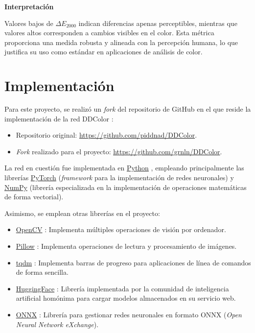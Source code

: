 \documentclass[a4paper]{article}
\begin{document}
\medskip
\textbf{Interpretación}

Valores bajos de $\Delta E_{2000}$ indican diferencias apenas perceptibles, mientras que valores altos corresponden a cambios visibles en el color. Esta métrica proporciona una medida robusta y alineada con la percepción humana, lo que justifica su uso como estándar en aplicaciones de análisis de color.

\section{Implementación}

Para este proyecto, se realizó un \textit{fork} del repositorio de GitHub en el que reside la implementación de la red DDColor \cite{DDColorRepo}:

\begin{itemize}
  \item{Repositorio original: \url{https://github.com/piddnad/DDColor}.}
  \item{\textit{Fork} realizado para el proyecto: \url{https://github.com/grnln/DDColor}.}
\end{itemize}

La red en cuestión fue implementada en \href{https://www.python.org/}{Python} \cite{Python}, empleando principalmente las librerías \href{https://pytorch.org/}{PyTorch} \cite{PyTorch} (\textit{framework} para la implementación de redes neuronales) y \href{https://numpy.org/}{NumPy} \cite{NumPy} (librería especializada en la implementación de operaciones matemáticas de forma vectorial).

Asimismo, se emplean otras librerías en el proyecto:

\begin{itemize}
  \item{\href{https://opencv.org/}{OpenCV} \cite{OpenCV}: Implementa múltiples operaciones de visión por ordenador.}
  \item{\href{https://pillow.readthedocs.io/en/stable/}{Pillow} \cite{Pillow}: Implementa operaciones de lectura y procesamiento de imágenes.}
  \item{\href{https://tqdm.github.io/}{tqdm} \cite{TQDM}: Implementa barras de progreso para aplicaciones de línea de comandos de forma sencilla.}
  \item{\href{https://huggingface.co/}{HuggingFace} \cite{HuggingFace}: Librería implementada por la comunidad de inteligencia artificial homónima para cargar modelos almacenados en su servicio web.}
  \item{\href{https://pypi.org/project/onnx/}{ONNX} \cite{ONNX}: Librería para gestionar redes neuronales en formato ONNX (\textit{Open Neural Network eXchange}).}
\end{itemize}
\end{document}
